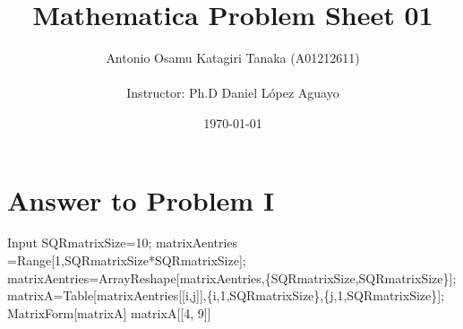 \documentclass[11pt,a4paper]{article}
\title
{
    Mathematica Problem Sheet 01
}
\author
{    
    Antonio Osamu Katagiri Tanaka (A01212611) \\
    \\
    Instructor: Ph.D Daniel L{\' o}pez Aguayo
}
\date{\today}
\providecommand{\keywords}[1]
{
    \\
    \\
    \small
    \textbf{\textit{Keywords:}} #1
}
\begin{document}
\setlength\parindent{0pt} %


\maketitle


\clearpage








\section{Answer to Problem I}\label{sec:P01}

\begin{mmaCell}[moredefined={SQRmatrixSize, matrixAentries, matrixA, \
i, j}]{Input}
SQRmatrixSize=10;
matrixAentries =Range[1,SQRmatrixSize*SQRmatrixSize];
matrixAentries=ArrayReshape[matrixAentries,\{SQRmatrixSize,SQRmatrixSize\}];
matrixA=Table[matrixAentries[[i,j]],\{i,1,SQRmatrixSize\},\{j,1,SQRmatrixSize\}];
MatrixForm[matrixA]
matrixA[[4, 9]]
\end{mmaCell}
\end{document}
